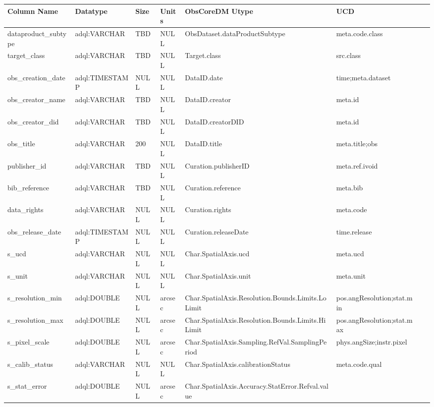 \documentclass[11pt,a4paper]{ivoa}
\begin{document}
%
\newpage
\begin{table}
\small
\begin{tabular}{ | l | l | l | l | l | l | l | l}%
\hline
Column Name & Datatype & Size & Units & ObsCoreDM Utype & UCD \\\hline
dataproduct\_subtype &
adql:VARCHAR &
TBD &
NULL &
ObsDataset.dataProductSubtype &
meta.code.class
\\\hline
target\_class &
adql:VARCHAR &
TBD &
NULL &
Target.class &
src.class
\\\hline
obs\_creation\_date &
adql:TIMESTAMP &
NULL &
NULL &
DataID.date &
time;meta.dataset
\\\hline
obs\_creator\_name   &
adql:VARCHAR &
TBD &
NULL &
DataID.creator &
meta.id
\\\hline
obs\_creator\_did &
adql:VARCHAR &
TBD &
NULL &
DataID.creatorDID &
meta.id
\\\hline
obs\_title &
adql:VARCHAR &
200 &
NULL &
DataID.title &
meta.title;obs
\\\hline
publisher\_id   &
adql:VARCHAR &
TBD &
NULL &
Curation.publisherID &
meta.ref.ivoid
\\\hline
bib\_reference   &
adql:VARCHAR &
TBD &
NULL &
Curation.reference &
meta.bib
\\\hline
data\_rights   &
adql:VARCHAR &
NULL &
 NULL &
Curation.rights &
meta.code
\\\hline
obs\_release\_date &
adql:TIMESTAMP &
NULL &
NULL &
Curation.releaseDate &
time.release
\\\hline
s\_ucd   &
adql:VARCHAR &
NULL &
NULL &
Char.SpatialAxis.ucd &
meta.ucd
\\\hline
s\_unit   &
adql:VARCHAR &
NULL &
NULL &
Char.SpatialAxis.unit &
meta.unit
\\\hline
s\_resolution\_min &
adql:DOUBLE &
NULL &
arcsec &
Char.SpatialAxis.Resolution.Bounds.Limits.LoLimit &
pos.angResolution;stat.min
\\\hline
s\_resolution\_max &
adql:DOUBLE &
NULL &
arcsec &
Char.SpatialAxis.Resolution.Bounds.Limits.HiLimit &
pos.angResolution;stat.max
\\\hline
s\_pixel\_scale &
adql:DOUBLE &
NULL &
arcsec &
Char.SpatialAxis.Sampling.RefVal.SamplingPeriod &
phys.angSize;instr.pixel
\\\hline
s\_calib\_status &
adql:VARCHAR &
NULL &
NULL &
Char.SpatialAxis.calibrationStatus &
meta.code.qual
\\\hline
s\_stat\_error &
adql:DOUBLE &
NULL &
arcsec &
Char.SpatialAxis.Accuracy.StatError.Refval.value &

\end{tabular}
\end{table}
\end{document}
